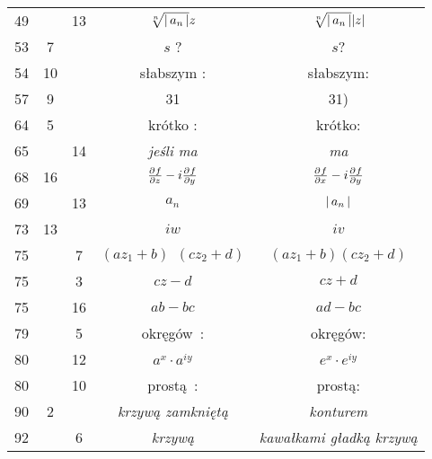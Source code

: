 \documentclass[a4paper,11pt]{article}
\begin{document}
\begin{center}
\begin{tabular}{|c|c|c|c|c|}
    49  & & 13 & $\sqrt[n]{ \left| \,  a_{ n }  \, \right| } z$
           & $\sqrt[n]{ \left| \,  a_{ n }  \, \right| } | z |$ \\
    53  &  7 & & $s$ ? & $s$? \\
    54  & 10 & & słabszym : & słabszym: \\
    57  &  9 & & 31 & 31) \\
    64  &  5 & & krótko : & krótko: \\
    65  & & 14 & \emph{jeśli ma} & \emph{ma} \\
    68  & 16 & & $\frac{ \partial^{  } {  f  } }{ \partial {  z  }^{  } } - i \frac{ \partial^{  } {  f  } }{ \partial {  y  }^{  } }$
           & $\frac{ \partial^{  } {  f  } }{ \partial {  x  }^{  } } - i \frac{ \partial^{  } {  f  } }{ \partial {  y  }^{  } }$ \\
    69  & & 13 & $a_{ n }$ & $\left| \,  a_{ n }  \, \right|$ \\
    73  & 13 & & $iw$ & $iv$ \\
    75  & &  7 & $( a z_{ 1 } + b )\;\, ( c z_{ 2 } + d )$
           & $( a z_{ 1 } + b ) ( c z_{ 2 } + d )$ \\
    75  & &  3 & $c z - d$ & $c z + d$ \\
    75  & & 16 & $ab - bc$ & $ad - bc$ \\
    79  & &  5 & okręgów~: & okręgów: \\
    80  & & 12 & $a^{ x } \cdot a^{ iy }$ & $e^{ x } \cdot e^{ iy }$ \\
    80  & & 10 & prostą~: & prostą: \\
    90  &  2 & & \emph{krzywą zamkniętą} & \emph{konturem} \\
    92  & &  6 & \emph{krzywą} & \emph{kawałkami gładką krzywą} \\
    \hline
  \end{tabular}


\end{center}
\end{document}
